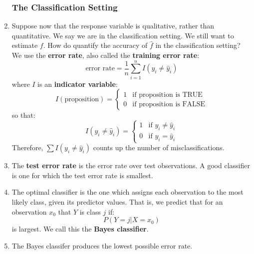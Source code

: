 \documentclass[10pt]{article}
\newcommand{\fhat}{\hat{f}}
\begin{document}
\begin{enumerate}
\subsubsection{The Classification Setting} 
\item Suppose now that the response variable is qualitative, rather than quantitative.  We say we are in the classification setting.  We still want to estimate $f$.  How do quantify the accuracy of $\fhat$ in the classification setting?  We use the \textbf{error rate}, also called the \textbf{training error rate}:
$$\text{error rate} = \dfrac{1}{n} \sum_{i = 1}^n I(y_i \neq \hat{y}_i) $$
where $I$ is an \textbf{indicator variable}: 
$$I(\text{proposition}) = \begin{cases} 1 & \text{if proposition is TRUE} \\ 0 & \text{if proposition is FALSE}  \end{cases}$$
so that:
$$I(y_i \neq \hat{y}_i)  = \begin{cases} 
1 & \text{if } y_i \neq \hat{y}_i \\
0 & \text{if } y_i =  \hat{y}_i
\end{cases}$$
Therefore, $\sum I(y_i \neq \hat{y}_i)$ counts up the number of misclassifications.

\item The \textbf{test error rate} is the error rate over test observations.  A good classifier is one for which the test error rate is smallest.

\item The optimal classifier is the one which assigns each observation to the most likely class, given its predictor values.  That is, we predict that for an observation $x_0$ that $Y$ is class $j$ if:
$$P(Y = j | X = x_0)$$
is largest.  We call this the \textbf{Bayes classifier}. 
\item The Bayes classifer produces the lowest possible error rate.


\end{enumerate}
\end{document}
